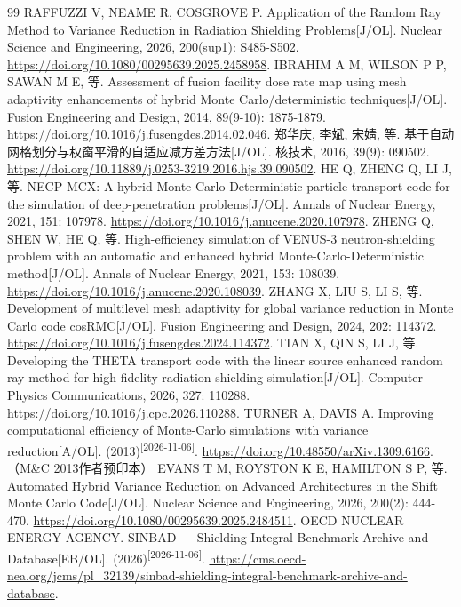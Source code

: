 \documentclass[UTF8, zihao=-4, fontset=none, a4paper]{ctexart}
\newcommand{\upcite}[1]{\textsuperscript{[#1]}}
\begin{document}
\begin{thebibliography}{99}
 RAFFUZZI V, NEAME R, COSGROVE P. Application of the Random Ray Method to Variance Reduction in Radiation Shielding Problems{[}J/OL{]}. Nuclear Science and Engineering, 2026, 200(sup1): S485-S502. \url{https://doi.org/10.1080/00295639.2025.2458958}.
 IBRAHIM A M, WILSON P P, SAWAN M E, 等. Assessment of fusion facility dose rate map using mesh adaptivity enhancements of hybrid Monte Carlo/deterministic techniques{[}J/OL{]}. Fusion Engineering and Design, 2014, 89(9-10): 1875-1879. \url{https://doi.org/10.1016/j.fusengdes.2014.02.046}.
 郑华庆, 李斌, 宋婧, 等. 基于自动网格划分与权窗平滑的自适应减方差方法{[}J/OL{]}. 核技术, 2016, 39(9): 090502. \url{https://doi.org/10.11889/j.0253-3219.2016.hjs.39.090502}.
 HE Q, ZHENG Q, LI J, 等. NECP-MCX: A hybrid Monte-Carlo-Deterministic particle-transport code for the simulation of deep-penetration problems{[}J/OL{]}. Annals of Nuclear Energy, 2021, 151: 107978. \url{https://doi.org/10.1016/j.anucene.2020.107978}.
 ZHENG Q, SHEN W, HE Q, 等. High-efficiency simulation of VENUS-3 neutron-shielding problem with an automatic and enhanced hybrid Monte-Carlo-Deterministic method{[}J/OL{]}. Annals of Nuclear Energy, 2021, 153: 108039. \url{https://doi.org/10.1016/j.anucene.2020.108039}.
 ZHANG X, LIU S, LI S, 等. Development of multilevel mesh adaptivity for global variance reduction in Monte Carlo code cosRMC{[}J/OL{]}. Fusion Engineering and Design, 2024, 202: 114372. \url{https://doi.org/10.1016/j.fusengdes.2024.114372}.
 TIAN X, QIN S, LI J, 等. Developing the THETA transport code with the linear source enhanced random ray method for high-fidelity radiation shielding simulation{[}J/OL{]}. Computer Physics Communications, 2026, 327: 110288. \url{https://doi.org/10.1016/j.cpc.2026.110288}.
 TURNER A, DAVIS A. Improving computational efficiency of Monte-Carlo simulations with variance reduction{[}A/OL{]}. (2013)\upcite{2026-11-06}. \url{https://doi.org/10.48550/arXiv.1309.6166}.（M\&C 2013作者预印本）
 EVANS T M, ROYSTON K E, HAMILTON S P, 等. Automated Hybrid Variance Reduction on Advanced Architectures in the Shift Monte Carlo Code{[}J/OL{]}. Nuclear Science and Engineering, 2026, 200(2): 444-470. \url{https://doi.org/10.1080/00295639.2025.2484511}.
 OECD NUCLEAR ENERGY AGENCY. SINBAD -\/-\/- Shielding Integral Benchmark Archive and Database{[}EB/OL{]}. (2026)\upcite{2026-11-06}. \url{https://cms.oecd-nea.org/jcms/pl_32139/sinbad-shielding-integral-benchmark-archive-and-database}.

\end{thebibliography}
\end{document}
